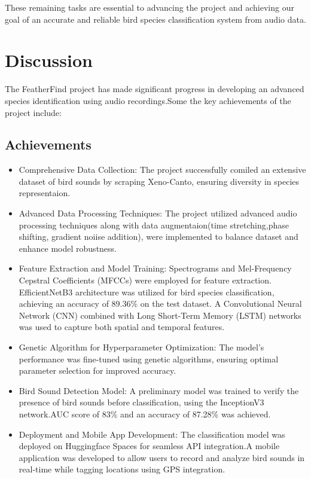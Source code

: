 These remaining tasks are essential to advancing the project and achieving our
goal of an accurate and reliable bird species classification system from audio
data.

\newpage

\chapter{Discussion}
The FeatherFind project has made significant progress in developing an advanced
species identification using audio recordings.Some the key achievements of the
project include:
\section{Achievements}
\begin{itemize}
    \item Comprehensive Data Collection: The project successfully comiled an extensive
          dataset of bird sounds by scraping Xeno-Canto, ensuring diversity in species
          representaion.
    \item Advanced Data Processing Techniques: The project utilized advanced audio
          processing techniques along with data augmentaion(time stretching,phase
          shifting, gradient noiise addition), were implemented to balance dataset and
          enhance model robustness.
    \item Feature Extraction and Model Training: Spectrograms and Mel-Frequency Cepstral
          Coefficients (MFCCs) were employed for feature extraction. EfficientNetB3
          architecture was utilized for bird species classification, achieving an
          accuracy of 89.36\% on the test dataset. A Convolutional Neural Network (CNN)
          combined with Long Short-Term Memory (LSTM) networks was used to capture both
          spatial and temporal features.
    \item Genetic Algorithm for Hyperparameter Optimization: The model's performance was
          fine-tuned using genetic algorithms, ensuring optimal parameter selection for
          improved accuracy.
    \item Bird Sound Detection Model: A preliminary model was trained to verify the
          presence of bird sounds before classification, using the InceptionV3
          network.AUC score of 83\% and an accuracy of 87.28\% was achieved.
    \item Deployment and Mobile App Development: The classification model was deployed on
          Huggingface Spaces for seamless API integration.A mobile application was
          developed to allow users to record and analyze bird sounds in real-time while
          tagging locations using GPS integration.
\end{itemize}

